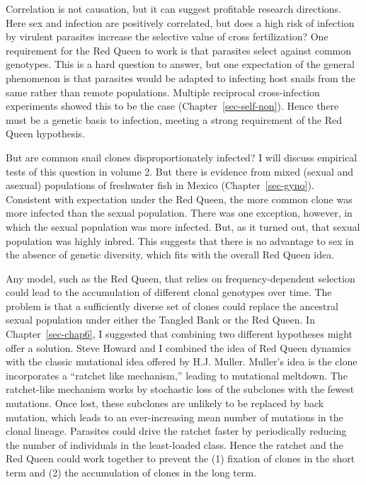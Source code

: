 \documentclass[
  letterpaper,
]{book}
\begin{document}
Correlation is not causation, but it can suggest profitable research
directions. Here sex and infection are positively correlated, but does a
high risk of infection by virulent parasites increase the selective
value of cross fertilization? One requirement for the Red Queen to work
is that parasites select against common genotypes. This is a hard
question to answer, but one expectation of the general phenomenon is
that parasites would be adapted to infecting host snails from the same
rather than remote populations. Multiple reciprocal cross-infection
experiments showed this to be the case (Chapter~\ref{sec-self-non}).
Hence there must be a genetic basis to infection, meeting a strong
requirement of the Red Queen hypothesis.

But are common snail clones disproportionately infected? I will discuss
empirical tests of this question in volume 2. But there is evidence from
mixed (sexual and asexual) populations of freshwater fish in Mexico
(Chapter~\ref{sec-gyno}). Consistent with expectation under the Red
Queen, the more common clone was more infected than the sexual
population. There was one exception, however, in which the sexual
population was more infected. But, as it turned out, that sexual
population was highly inbred. This suggests that there is no advantage
to sex in the absence of genetic diversity, which fits with the overall
Red Queen idea.

Any model, such as the Red Queen, that relies on frequency-dependent
selection could lead to the accumulation of different clonal genotypes
over time. The problem is that a sufficiently diverse set of clones
could replace the ancestral sexual population under either the Tangled
Bank or the Red Queen. In Chapter~\ref{sec-chap6}, I suggested that
combining two different hypotheses might offer a solution. Steve Howard
and I combined the idea of Red Queen dynamics with the classic
mutational idea offered by H.J. Muller. Muller's idea is the clone
incorporates a ``ratchet like mechanism,'' leading to mutational
meltdown. The ratchet-like mechanism works by stochastic loss of the
subclones with the fewest mutations. Once lost, these subclones are
unlikely to be replaced by back mutation, which leads to an
ever-increasing mean number of mutations in the clonal lineage.
Parasites could drive the ratchet faster by periodically reducing the
number of individuals in the least-loaded class. Hence the ratchet and
the Red Queen could work together to prevent the (1) fixation of clones
in the short term and (2) the accumulation of clones in the long term.
\end{document}
